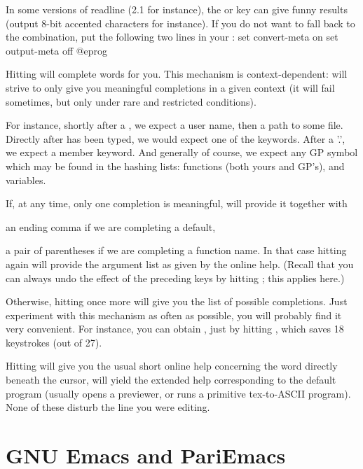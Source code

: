  In some versions of readline (2.1 for instance), the
 or  key can give funny results (output 8-bit accented
characters for instance). If you do not want to fall back to the 
combination, put the following two lines in your :
%
\bprog
  set convert-meta on
  set output-meta off
@eprog

 Hitting
 will complete words for you. This mechanism is context-dependent:
 will strive to only give you meaningful completions in a given
context (it will fail sometimes, but only under rare and restricted
conditions).

  For instance, shortly after a \kbd{\til}, we expect a user name, then a
path to some file. Directly after  has been typed, we would
expect one of the  keywords. After a '.', we expect a member
keyword. And generally of course, we expect any GP symbol which may be found
in the hashing lists: functions (both yours and GP's), and variables.

  If, at any time, only one completion is meaningful,  will provide it
together with

\item an ending comma if we are completing a default,

\item a pair of parentheses if we are completing a function name. In
that case hitting  again will provide the argument list as given
by the online help. (Recall that you can always undo the effect
of the preceding keys by hitting ; this applies here.)

Otherwise, hitting  once more will give you the list of possible
completions. Just experiment with this mechanism as often as possible,
you will probably find it very convenient. For instance, you can obtain
, just by hitting ,
which saves 18 keystrokes (out of 27).

  Hitting  will give you the usual short online help concerning the
word directly beneath the cursor,  will yield the extended help
corresponding to the  default program (usually opens a 
previewer, or runs a primitive tex-to-ASCII program). None of these disturb
the line you were editing.

\section{GNU Emacs and PariEmacs}
\label{se:emacs}

